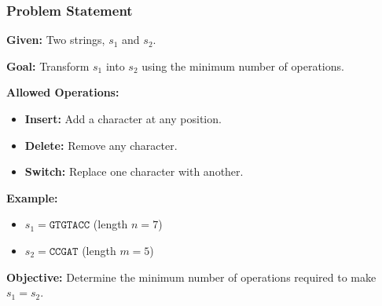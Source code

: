 \documentclass[10pt,aspectratio=43]{beamer}
\begin{document}
\begin{frame}
    \frametitle{Problem Statement}

    \textbf{Given:} Two strings, $s_1$ and $s_2$.

    \vspace{0.3cm}

    \textbf{Goal:} Transform $s_1$ into $s_2$ using the minimum number of operations.

    \vspace{0.3cm}

    \textbf{Allowed Operations:}
    \begin{itemize}
        \item \textbf{Insert:} Add a character at any position.
        \item \textbf{Delete:} Remove any character.
        \item \textbf{Switch:} Replace one character with another.
    \end{itemize}

    \vspace{0.3cm}

    \textbf{Example:}
    \begin{itemize}
        \item $s_1 = \texttt{GTGTACC}$ \quad (length $n = 7$)
        \item $s_2 = \texttt{CCGAT}$ \quad (length $m = 5$)
    \end{itemize}

    \vspace{0.3cm}

    \textbf{Objective:} Determine the minimum number of operations required to make $s_1 = s_2$.
\end{frame}
\end{document}
